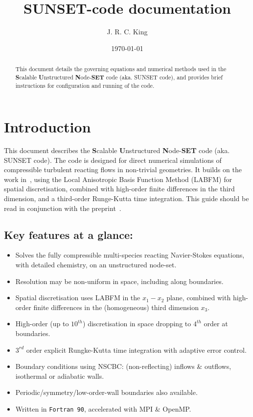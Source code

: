 \documentclass[notitlepage]{revtex4-1}
\begin{document}
\title{SUNSET-code documentation}

\author{J. R. C. King}
\date{\today}
\begin{abstract}
This document details the governing equations and numerical methods used in the \textbf{S}calable \textbf{U}nstructured \textbf{N}ode-\textbf{SET} code (aka. SUNSET code), and provides brief instructions for configuration and running of the code.

\end{abstract}

\maketitle

\section{Introduction}

This document describes the \textbf{S}calable \textbf{U}nstructured \textbf{N}ode-\textbf{SET} code (aka. SUNSET code). The code is designed for direct numerical simulations of compressible turbulent reacting flows in non-trivial geometries. It builds on the work in~\cite{king_2020,king_2022}, using the Local Anisotropic Basis Function Method (LABFM) for spatial discretisation, combined with high-order finite differences in the third dimension, and a third-order Runge-Kutta time integration. This guide should be read in conjunction with the preprint~\cite{king_2023}.

\subsection{Key features at a glance:}
\begin{itemize}
\item Solves the fully compressible multi-species reacting Navier-Stokes equations, with detailed chemistry, on an unstructured node-set.
\item Resolution may be non-uniform in space, including along boundaries.
\item Spatial discretisation uses LABFM in the $x_{1}-x_{2}$ plane, combined with high-order finite differences in the (homogeneous) third dimension $x_{3}$.
\item High-order (up to $10^{th}$) discretisation in space dropping to $4^{th}$ order at boundaries.
\item $3^{rd}$ order explicit Rungke-Kutta time integration with adaptive error control.
\item Boundary conditions using NSCBC: (non-reflecting) inflows \& outflows, isothermal or adiabatic walls.
\item Periodic/symmetry/low-order-wall boundaries also available.
\item Written in \verb|Fortran 90|, accelerated with MPI \& OpenMP.
\end{itemize}
\end{document}
